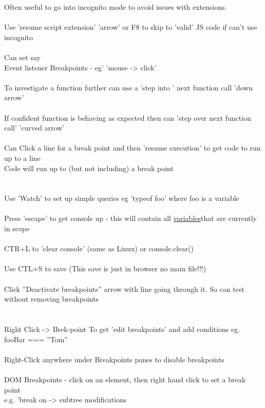 \documentclass[10pt,a4paper]{article}
\begin{document}
{\large Often useful to go into incognito mode to avoid issues with extensions.\\
\\
Use 'resume script extension' 'arrow' or F8 to skip to 'valid' JS code if can't use incognito\\
\\
Can set say\\
Event listener Breakpoints - eg' 'mouse -> click'\\
\\
To investigate a function further can use a 'step into ' next function call 'down arrow'\\
\\
If confident function is behaving as expected then can 'step over next function call' 'curved arrow' \\
\\
Can Click a line for a break point and then 'resume execution' to get code to run up to a line\\
Code will run up to (but not including) a break point\\
\\
\\
Use 'Watch' to set up simple queries eg 'typeof foo' where foo is a variable\\
\\
Press 'escape' to get console up - this will contain all \hyperlink{variables}{variables}}{\large  that are currently in scope\\
\\
CTR+L to 'clear console' (same as Linux) or console.clear()\\
\\
Use CTL+S to save (This save is just in browser no main file!!!)\\
\\
Click ''Deactivate breakpoints''  arrow with line going through it. So can test without removing breakpoints\\
\\
\\
Right Click -> Brek-point  To get 'edit breakpoints' and add conditions eg. fooBar === ''Tom''\\
\\
Right-Click  anywhere under Breakpoints panes to disable breakpoints\\
\\
DOM Breakpoints - click on an element, then right hand click to set a break point\\
e.g. 'break on -> subtree modifications\\
}
\end{document}
